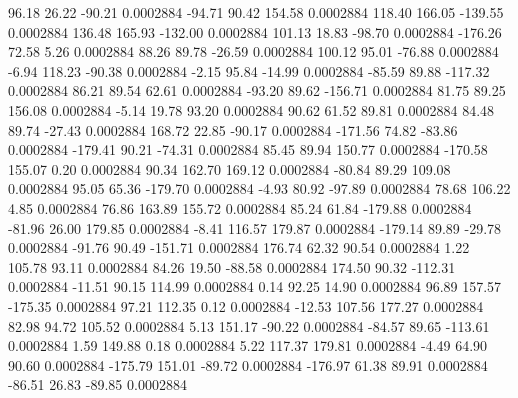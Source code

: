        96.18       26.22      -90.21     0.0002884
      -94.71       90.42      154.58     0.0002884
      118.40      166.05     -139.55     0.0002884
      136.48      165.93     -132.00     0.0002884
      101.13       18.83      -98.70     0.0002884
     -176.26       72.58        5.26     0.0002884
       88.26       89.78      -26.59     0.0002884
      100.12       95.01      -76.88     0.0002884
       -6.94      118.23      -90.38     0.0002884
       -2.15       95.84      -14.99     0.0002884
      -85.59       89.88     -117.32     0.0002884
       86.21       89.54       62.61     0.0002884
      -93.20       89.62     -156.71     0.0002884
       81.75       89.25      156.08     0.0002884
       -5.14       19.78       93.20     0.0002884
       90.62       61.52       89.81     0.0002884
       84.48       89.74      -27.43     0.0002884
      168.72       22.85      -90.17     0.0002884
     -171.56       74.82      -83.86     0.0002884
     -179.41       90.21      -74.31     0.0002884
       85.45       89.94      150.77     0.0002884
     -170.58      155.07        0.20     0.0002884
       90.34      162.70      169.12     0.0002884
      -80.84       89.29      109.08     0.0002884
       95.05       65.36     -179.70     0.0002884
       -4.93       80.92      -97.89     0.0002884
       78.68      106.22        4.85     0.0002884
       76.86      163.89      155.72     0.0002884
       85.24       61.84     -179.88     0.0002884
      -81.96       26.00      179.85     0.0002884
       -8.41      116.57      179.87     0.0002884
     -179.14       89.89      -29.78     0.0002884
      -91.76       90.49     -151.71     0.0002884
      176.74       62.32       90.54     0.0002884
        1.22      105.78       93.11     0.0002884
       84.26       19.50      -88.58     0.0002884
      174.50       90.32     -112.31     0.0002884
      -11.51       90.15      114.99     0.0002884
        0.14       92.25       14.90     0.0002884
       96.89      157.57     -175.35     0.0002884
       97.21      112.35        0.12     0.0002884
      -12.53      107.56      177.27     0.0002884
       82.98       94.72      105.52     0.0002884
        5.13      151.17      -90.22     0.0002884
      -84.57       89.65     -113.61     0.0002884
        1.59      149.88        0.18     0.0002884
        5.22      117.37      179.81     0.0002884
       -4.49       64.90       90.60     0.0002884
     -175.79      151.01      -89.72     0.0002884
     -176.97       61.38       89.91     0.0002884
      -86.51       26.83      -89.85     0.0002884
